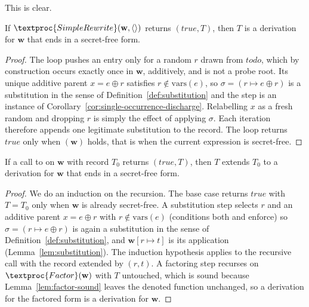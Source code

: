   This is clear.

  \begin{lemma}
  \label{lem:simple-sound}
  If $\textproc{SimpleRewrite}(\mathbf{w}, \langle\rangle)$ returns $(\mathit{true}, T)$, then
  $T$ is a derivation for $\mathbf{w}$ that ends in a secret-free form.
  \end{lemma}

  \begin{proof}
  The loop pushes an entry only for a random $r$ drawn from $\mathit{todo}$, which
  by construction occurs exactly once in $\mathbf{w}$, additively, and is not a
  probe root. Its unique additive parent $x = e \oplus r$ satisfies
  $r \notin \mathrm{vars}(e)$, so $\sigma = (r \mapsto e \oplus r)$ is a
  substitution in the sense of Definition~\ref{def:substitution} and the step is an
  instance of Corollary~\ref{cor:single-occurrence-discharge}. Relabelling $x$ as a
  fresh random and dropping $r$ is simply the effect of applying $\sigma$. Each
  iteration therefore appends one legitimate substitution to the record. The loop
  returns $\mathit{true}$ only when $(\mathbf{w})$ holds, that
  is when the current expression is secret-free.
  \end{proof}

  \begin{lemma}
  \label{lem:general-sound}
  If a call to  on $\mathbf{w}$ with record $T_0$ returns
  $(\mathit{true}, T)$, then $T$ extends $T_0$ to a derivation for $\mathbf{w}$
  that ends in a secret-free form.
  \end{lemma}

  \begin{proof}
  We do an induction on the recursion. The base case returns $\mathit{true}$ with
  $T = T_0$ only when $\mathbf{w}$ is already secret-free. A substitution step selects
  $r$ and an additive parent $x = e \oplus r$ with $r \notin \mathrm{vars}(e)$ (conditions
  both  and  enforce)
  so $\sigma = (r \mapsto e \oplus r)$ is again a substitution in the sense of
  Definition~\ref{def:substitution}, and $\mathbf{w}[r \mapsto t]$ is its
  application (Lemma~\ref{lem:substitution}). The induction hypothesis applies to
  the recursive call with the record extended by $(r,t)$. A factoring step recurses
  on $\textproc{Factor}(\mathbf{w})$ with $T$ untouched, which is sound because
  Lemma~\ref{lem:factor-sound} leaves the denoted function unchanged, so a
  derivation for the factored form is a derivation for $\mathbf{w}$.
  \end{proof}

